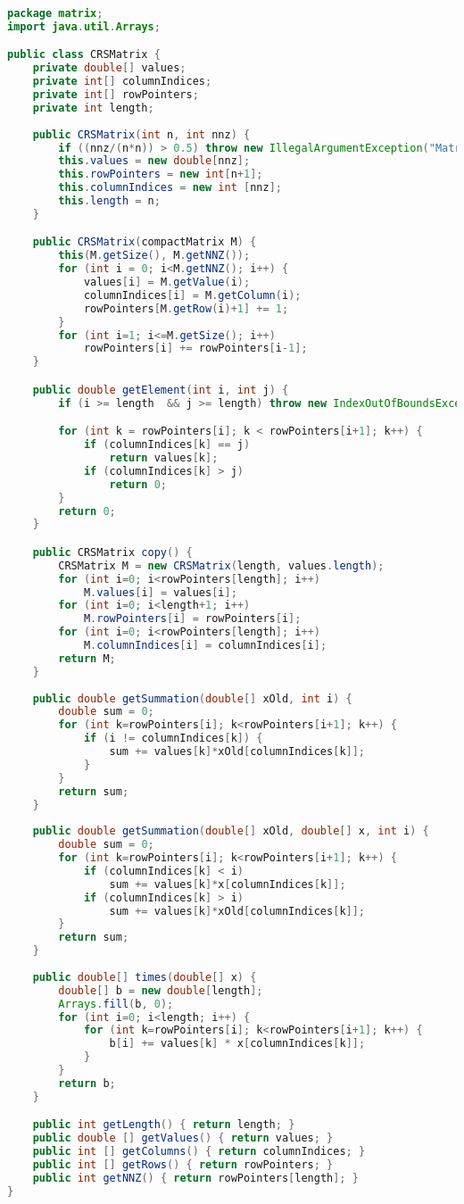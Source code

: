 \documentclass[12pt]{article}
\begin{document}
\begin{lstlisting}[language=Java]
package matrix;
import java.util.Arrays;

public class CRSMatrix {
	private double[] values;
	private int[] columnIndices;
	private int[] rowPointers;
	private int length;
	
	public CRSMatrix(int n, int nnz) {
		if ((nnz/(n*n)) > 0.5) throw new IllegalArgumentException("Matrice non sparsa!");
		this.values = new double[nnz];
		this.rowPointers = new int[n+1];
		this.columnIndices = new int [nnz];
		this.length = n;
	}

	public CRSMatrix(compactMatrix M) {
		this(M.getSize(), M.getNNZ());
		for (int i = 0; i<M.getNNZ(); i++) {
			values[i] = M.getValue(i);
			columnIndices[i] = M.getColumn(i);
			rowPointers[M.getRow(i)+1] += 1;
		}
		for (int i=1; i<=M.getSize(); i++)
			rowPointers[i] += rowPointers[i-1];
	}

	public double getElement(int i, int j) {
		if (i >= length  && j >= length) throw new IndexOutOfBoundsException();

		for (int k = rowPointers[i]; k < rowPointers[i+1]; k++) {
			if (columnIndices[k] == j)
				return values[k];
			if (columnIndices[k] > j)
				return 0;
		}
		return 0;
	}

	public CRSMatrix copy() {
		CRSMatrix M = new CRSMatrix(length, values.length);
		for (int i=0; i<rowPointers[length]; i++)
			M.values[i] = values[i];
		for (int i=0; i<length+1; i++)
			M.rowPointers[i] = rowPointers[i];
		for (int i=0; i<rowPointers[length]; i++)
			M.columnIndices[i] = columnIndices[i];
		return M;
	}
	
	public double getSummation(double[] xOld, int i) {
		double sum = 0;
		for (int k=rowPointers[i]; k<rowPointers[i+1]; k++) {
			if (i != columnIndices[k]) {
				sum += values[k]*xOld[columnIndices[k]];
			}
		}
		return sum;
	}
	
	public double getSummation(double[] xOld, double[] x, int i) {
		double sum = 0;
		for (int k=rowPointers[i]; k<rowPointers[i+1]; k++) {
			if (columnIndices[k] < i)
				sum += values[k]*x[columnIndices[k]];
			if (columnIndices[k] > i)
				sum += values[k]*xOld[columnIndices[k]];
		}	
		return sum;
	}
	
	public double[] times(double[] x) {
		double[] b = new double[length];
		Arrays.fill(b, 0);
		for (int i=0; i<length; i++) {
			for (int k=rowPointers[i]; k<rowPointers[i+1]; k++) {
				b[i] += values[k] * x[columnIndices[k]];
			}
		}
		return b;
	}

	public int getLength() { return length;	}
	public double [] getValues() { return values; }
	public int [] getColumns() { return columnIndices; }
	public int [] getRows() { return rowPointers; }
	public int getNNZ() { return rowPointers[length]; }
}
\end{lstlisting}
\end{document}

